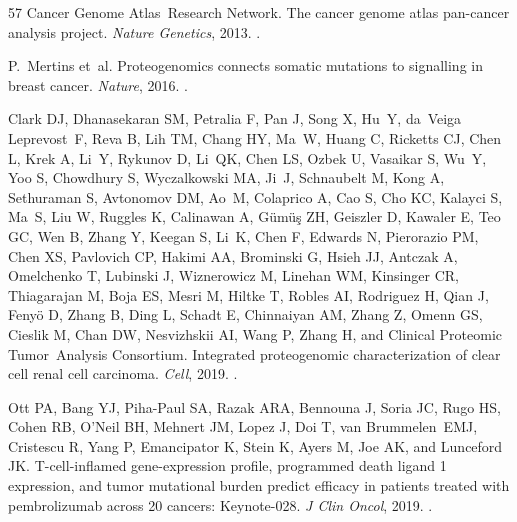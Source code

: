 \documentclass[11pt]{article}
\begin{document}
\begin{thebibliography}{57}
Cancer Genome Atlas~Research Network.
\newblock The cancer genome atlas pan-cancer analysis project.
\newblock \emph{Nature Genetics}, 2013.
\newblock {}.

P.~Mertins et~al.
\newblock Proteogenomics connects somatic mutations to signalling in breast
  cancer.
\newblock \emph{Nature}, 2016.
\newblock {}.

Clark DJ, Dhanasekaran SM, Petralia F, Pan J, Song X, Hu~Y, da~Veiga
  Leprevost~F, Reva B, Lih TM, Chang HY, Ma~W, Huang C, Ricketts CJ, Chen L,
  Krek A, Li~Y, Rykunov D, Li~QK, Chen LS, Ozbek U, Vasaikar S, Wu~Y, Yoo S,
  Chowdhury S, Wyczalkowski MA, Ji~J, Schnaubelt M, Kong A, Sethuraman S,
  Avtonomov DM, Ao~M, Colaprico A, Cao S, Cho KC, Kalayci S, Ma~S, Liu W,
  Ruggles K, Calinawan A, Gümüş ZH, Geiszler D, Kawaler E, Teo GC, Wen B,
  Zhang Y, Keegan S, Li~K, Chen F, Edwards N, Pierorazio PM, Chen XS, Pavlovich
  CP, Hakimi AA, Brominski G, Hsieh JJ, Antczak A, Omelchenko T, Lubinski J,
  Wiznerowicz M, Linehan WM, Kinsinger CR, Thiagarajan M, Boja ES, Mesri M,
  Hiltke T, Robles AI, Rodriguez H, Qian J, Fenyö D, Zhang B, Ding L, Schadt
  E, Chinnaiyan AM, Zhang Z, Omenn GS, Cieslik M, Chan DW, Nesvizhskii AI, Wang
  P, Zhang H, and Clinical Proteomic Tumor~Analysis Consortium.
\newblock Integrated proteogenomic characterization of clear cell renal cell
  carcinoma.
\newblock \emph{Cell}, 2019.
\newblock {}.

Ott PA, Bang YJ, Piha-Paul SA, Razak ARA, Bennouna J, Soria JC, Rugo HS, Cohen
  RB, O'Neil BH, Mehnert JM, Lopez J, Doi T, van Brummelen~EMJ, Cristescu R,
  Yang P, Emancipator K, Stein K, Ayers M, Joe AK, and Lunceford JK.
\newblock T-cell-inflamed gene-expression profile, programmed death ligand 1
  expression, and tumor mutational burden predict efficacy in patients treated
  with pembrolizumab across 20 cancers: Keynote-028.
\newblock \emph{J Clin Oncol}, 2019.
\newblock {}.


\end{thebibliography}
\end{document}
